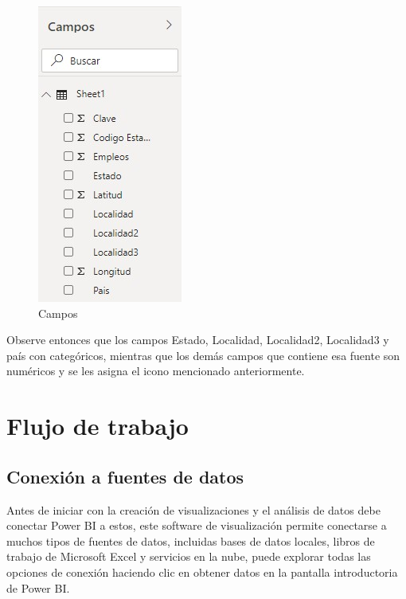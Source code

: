 \documentclass[
]{book}
\begin{document}
\begin{figure}

{\centering \includegraphics[width=0.2\linewidth]{Imágenes/powerbi7} 

}

\caption{Campos}\label{fig:campospowerbi-fig}
\end{figure}

Observe entonces que los campos Estado, Localidad, Localidad2, Localidad3 y país con categóricos, mientras que los demás campos que contiene esa fuente son numéricos y se les asigna el icono mencionado anteriormente.

\hypertarget{flujotrabajopowerbi}{%
\section{Flujo de trabajo}\label{flujotrabajopowerbi}}

\hypertarget{conexionfuentesdatospowerbi}{%
\subsection{Conexión a fuentes de datos}\label{conexionfuentesdatospowerbi}}

Antes de iniciar con la creación de visualizaciones y el análisis de datos debe conectar Power BI a estos, este software de visualización permite conectarse a muchos tipos de fuentes de datos, incluidas bases de datos locales, libros de trabajo de Microsoft Excel y servicios en la nube, puede explorar todas las opciones de conexión haciendo clic en obtener datos en la pantalla introductoria de Power BI.
\end{document}
